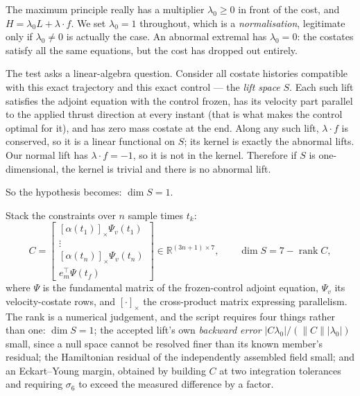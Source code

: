 \documentclass[11pt]{article}
\newcommand{\tf}{t_f}\newcommand{\R}{\mathbb{R}}
\begin{document}
\begin{intu}
The maximum principle really has a multiplier $\lambda_0 \ge 0$ in front of the
cost, and $H = \lambda_0 L + \lambda \cdot f$. We set $\lambda_0 = 1$ throughout,
which is a \emph{normalisation}, legitimate only if $\lambda_0 \ne 0$ is
actually the case. An abnormal extremal has $\lambda_0 = 0$: the costates
satisfy all the same equations, but the cost has dropped out entirely.

The test asks a linear-algebra question. Consider all costate histories
compatible with this exact trajectory and this exact control --- the
\emph{lift space} $S$. Each such lift satisfies the adjoint equation with the
control frozen, has its velocity part parallel to the applied thrust direction
at every instant (that is what makes the control optimal for it), and has zero
mass costate at the end. Along any such lift, $\lambda \cdot f$ is conserved, so
it is a linear functional on $S$; its kernel is exactly the abnormal lifts. Our
normal lift has $\lambda \cdot f = -1$, so it is not in the kernel. Therefore if
$S$ is one-dimensional, the kernel is trivial and there is no abnormal lift.

So the hypothesis becomes: $\dim S = 1$.
\end{intu}

\begin{rig}
Stack the constraints over $n$ sample times $t_k$:
\begin{equation}\label{eq:liftC}
C = \begin{bmatrix}
[\alpha(t_1)]_\times \Psi_v(t_1) \\ \vdots \\ [\alpha(t_n)]_\times \Psi_v(t_n) \\
e_m^\top \Psi(\tf)
\end{bmatrix} \in \R^{(3n+1) \times 7},
\qquad \dim S = 7 - \operatorname{rank} C,
\end{equation}
where $\Psi$ is the fundamental matrix of the frozen-control adjoint equation,
$\Psi_v$ its velocity-costate rows, and $[\cdot]_\times$ the cross-product
matrix expressing parallelism. The rank is a numerical judgement, and the
script requires four things rather than one: $\dim S = 1$; the accepted lift's
own \emph{backward error} $|C\lambda_0| / (\|C\| |\lambda_0|)$ small, since a
null space cannot be resolved finer than its known member's residual; the
Hamiltonian residual of the independently assembled field small; and an
Eckart--Young margin, obtained by building $C$ at two integration tolerances
and requiring $\sigma_6$ to exceed the measured difference by a factor.
\end{rig}
\end{document}
